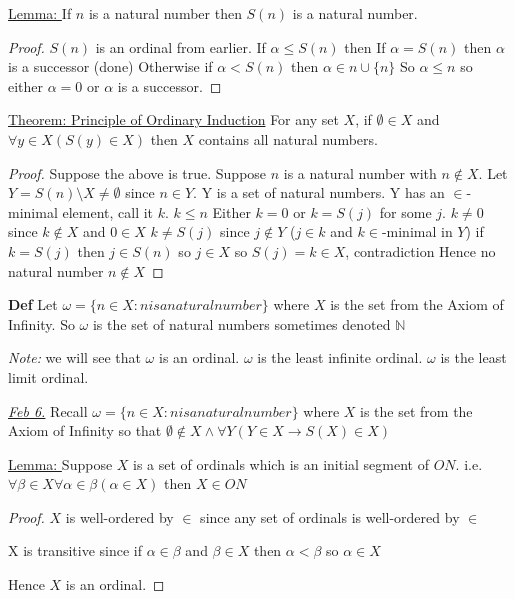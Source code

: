\documentclass{article}
\begin{document}
    \underline{Lemma: } If $n$ is a natural number then $S(n)$ is a natural number.
    \begin{proof}
        $S(n)$ is an ordinal from earlier.
        If $\alpha \leq S(n)$ then
        If $\alpha = S(n)$ then $\alpha$ is a successor (done)
        Otherwise if $\alpha < S(n)$ then $\alpha \in n \cup \{n\}$
        So $\alpha \leq n$ so either $\alpha = 0$ or $\alpha$ is a successor.
    \end{proof}

    \underline{Theorem: } \underline{Principle of Ordinary Induction}
    For any set $X$, if $\emptyset \in X$ and $\forall y \in X (S(y) \in X)$ then $X$ contains all natural numbers.

    \begin{proof}
        Suppose the above is true.
        Suppose $n$ is a natural number with $n \notin X$.
        Let $Y = S(n) \setminus X \neq \emptyset$ since $n \in Y$.
        Y is a set of natural numbers.
        Y has an $\in$-minimal element, call it $k$.
        $k \leq n$
        Either $k=0$ or $k = S(j)$ for some $j$.
        $k \neq 0$ since $k \notin X$ and $0 \in X$
        $k \neq S(j)$ since $j \notin Y$ ($j \in k$ and $k \in$-minimal in $Y$)
        if $k = S(j)$ then $j \in S(n)$ so $j \in X$ so $S(j) = k \in X$, contradiction
        Hence no natural number $n \notin X$
    \end{proof}

    \textbf{Def} Let $\omega = \{n \in X: n is a natural number\}$ where $X$ is the set from the Axiom of Infinity.
    So $\omega$ is the set of natural numbers sometimes denoted $\mathbb{N}$

    \emph{Note:} we will see that $\omega$ is an ordinal.
    $\omega$ is the least infinite ordinal.
    $\omega$ is the least limit ordinal.

    \underline{\emph{Feb 6.}}
    Recall $\omega = \{n \in X : n is a natural number\}$ where $X$ is the set from the Axiom of Infinity so that $\emptyset \notin X \wedge \forall Y (Y \in X \rightarrow S(X) \in X)$

    \underline{Lemma: } Suppose $X$ is a set of ordinals which is an initial segment of $ON$. i.e. $\forall \beta \in X \forall \alpha \in \beta (\alpha \in X)$ then $X \in  ON$

    \begin{proof}
        $X$ is well-ordered by $\in$ since any set of ordinals is well-ordered by $\in$

        X is transitive since if $\alpha \in \beta$ and $\beta \in X$ then $\alpha < \beta$ so $\alpha \in X$

        Hence $X$ is an ordinal.

    \end{proof}
\end{document}
